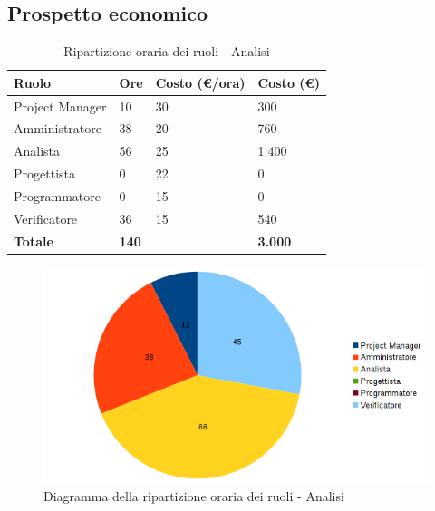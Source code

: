 \documentclass[12pt,a4paper]{article}
\begin{document}
\newpage
\subsection{Prospetto economico}

\begin{table}[h]
\begin{center}
\begin{tabular}{p{} p{} p{} p{} }
\toprule
\textbf{Ruolo}	& \textbf{Ore} & \textbf{Costo (\euro/ora)}	& \textbf{Costo (\euro)} \\
\midrule
\midrule
Project Manager & 10 & 30 & 300\\
\midrule
Amministratore & 38 & 20 & 760\\ 
\midrule
Analista & 56 & 25 & 1.400\\ 
\midrule
Progettista & 0 & 22 & 0\\ 
\midrule
Programmatore & 0 & 15 & 0\\ 
\midrule
Verificatore & 36 & 15 & 540\\ 
\midrule
\textbf{Totale} & \textbf{140} &  & \textbf{3.000}\\
\bottomrule
\end{tabular}
\caption{Ripartizione oraria dei ruoli - Analisi}
\end{center}
\end{table}

\begin{center}
\begin{figure}[h]
\centering
\includegraphics[width=\textwidth]{diagrammaTortaAnalisiTotaleOre.png}
\caption{Diagramma della ripartizione oraria dei ruoli - Analisi}
\end{figure}
\end{center}
\end{document}
